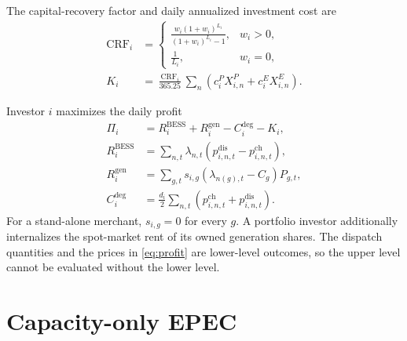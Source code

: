 \documentclass[11pt,a4paper,fleqn]{article}
\numberwithin{equation}{section}
\begin{document}
The capital-recovery factor and daily annualized investment cost are
\begin{subequations}\label{eq:capital-cost}
\begin{align}
\operatorname{CRF}_i
&=
\begin{cases}
\displaystyle
\frac{w_i(1+w_i)^{L_i}}{(1+w_i)^{L_i}-1},
& w_i>0,\\[1.1ex]
\displaystyle \frac{1}{L_i},
& w_i=0,
\end{cases}
\label{eq:crf}\\
K_i
&=\frac{\operatorname{CRF}_i}{365.25}
\sum_n
\left(c_i^P X^P_{i,n}+c_i^E X^E_{i,n}\right).
\label{eq:daily-capital-cost}
\end{align}
\end{subequations}

Investor $i$ maximizes the daily profit
\begin{subequations}\label{eq:profit}
\begin{align}
\Pi_i
&=R_i^{\mathrm{BESS}}+R_i^{\mathrm{gen}}
-C_i^{\mathrm{deg}}-K_i,
\label{eq:profit-total}\\
R_i^{\mathrm{BESS}}
&=\sum_{n,t}
\lambda_{n,t}
\left(p^{\mathrm{dis}}_{i,n,t}-p^{\mathrm{ch}}_{i,n,t}\right),
\label{eq:storage-revenue}\\
R_i^{\mathrm{gen}}
&=\sum_{g,t}
s_{i,g}\left(\lambda_{n(g),t}-C_g\right)P_{g,t},
\label{eq:generation-rent}\\
C_i^{\mathrm{deg}}
&=\frac{d_i}{2}
\sum_{n,t}
\left(p^{\mathrm{ch}}_{i,n,t}+p^{\mathrm{dis}}_{i,n,t}\right).
\label{eq:degradation-cost}
\end{align}
\end{subequations}
For a stand-alone merchant, $s_{i,g}=0$ for every $g$. A portfolio investor
additionally internalizes the spot-market rent of its owned generation shares.
The dispatch quantities and the prices in \eqref{eq:profit} are lower-level
outcomes, so the upper level cannot be evaluated without the lower level.

\section{Capacity-only EPEC}
\end{document}
